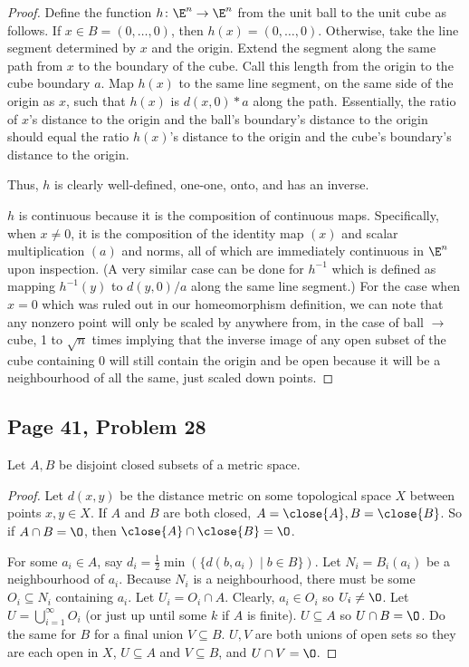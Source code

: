 \begin{proof}
    Define the function  $h\colon\E^n\to\E^n$ from the unit ball to the unit cube as follows. If $x \in B = (0, \ldots, 0)$, then $h(x) = (0,\ldots, 0)$. Otherwise, take the line segment determined by $x$ and the origin. Extend the segment along the same path from $x$ to the boundary of the cube. Call this length from the origin to the cube boundary $a$. Map $h(x)$ to the same line segment, on the same side of the origin as $x$, such that $h(x)$ is $d(x,0) * a$ along the path. Essentially, the ratio of $x$'s distance to the origin and the ball's boundary's distance to the origin should equal the ratio $h(x)$'s distance to the origin and the cube's boundary's distance to the origin.

    Thus, $h$ is clearly well-defined, one-one, onto, and has an inverse. 

    $h$ is continuous because it is the composition of continuous maps. Specifically, when $x \neq 0$, it is the composition of the identity map $(x)$ and scalar multiplication $(a)$ and norms, all of which are immediately continuous in $\E^n$ upon inspection. (A very similar case can be done for $h^{-1}$ which is defined as mapping $h^{-1}(y)$ to $d(y,0)/a$ along the same line segment.) For the case when $x = 0$ which was ruled out in our homeomorphism definition, we can note that any nonzero point will only be scaled by anywhere from, in the case of ball $\to$ cube, 1 to $\sqrt{n}$ times implying that the inverse image of any open subset of the cube containing 0 will still contain the origin and be open because it will be a neighbourhood of all the same, just scaled down points.
\end{proof}

\subsection*{Page 41, Problem 28}

Let $A,B$ be disjoint closed subsets of a metric space.

\begin{proof}
    Let $d(x,y)$ be the distance metric on some topological space $X$ between points $x, y \in X$. If $A$ and $B$ are both closed, $A = \close{A}, B = \close{B}$. So if $A \cap B = \O$, then $\close{A}\cap\close{B}=\O$.
    
    For some $a_i \in A$, say $d_i = \frac{1}{2}\min(\{d(b,a_i) \mid b \in B\})$. Let $N_i = B_i(a_i)$ be a neighbourhood of $a_i$. Because $N_i$ is a neighbourhood, there must be some $O_i \subseteq N_i$ containing $a_i$. Let $U_i = O_i \cap A$. Clearly, $a_i \in O_i$ so $U_i \neq \O$. Let $U = \bigcup_{i=1}^{\infty}O_i$ (or just up until some $k$ if $A$ is finite). $U \subseteq A$ so $U\cap B = \O$. Do the same for $B$ for a final union $V \subseteq B$. $U, V$ are both unions of open sets so they are each open in $X$, $U \subseteq A$ and $V \subseteq B$, and $U \cap V = \O$.
\end{proof}